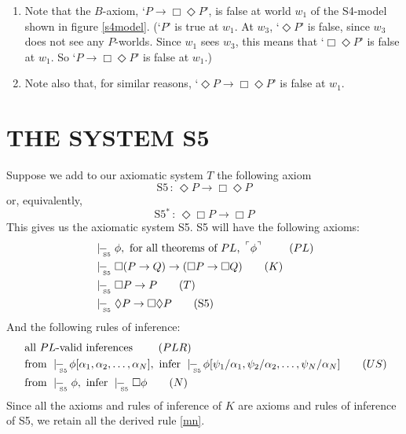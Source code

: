 \documentclass[landscape, two column, full page,reqno]{article}
\newcommand{\qe}{\begin{enumerate}[align=left,style=nextline,leftmargin=17pt,labelsep=5pt,font=\normalfont]}
\newcommand{\ze}{\end{enumerate}}
\newcommand{\p}{\item}
\newcommand{\fns}[1]{{\footnotesize #1}}
\newcommand{\qq}[1]{ ~\!^\ulcorner #1  ^\urcorner~\!}
\newcommand{\sfiveproves}{\mid\hspace{-3.9pt}-_{\!\!\!\raisebox{-3pt}{\text{\tiny S5}}}\hspace{3pt}}
\newcommand{\D}{\Diamond}
\newcommand{\B}{\Box}
\newcommand{\hs}{\hspace{2pt}}
\begin{document}
\p \qe \p Note that the $B$-axiom, `$P \to \B \D P$', is false at world $w_1$ of the S4-model shown in figure \ref{s4model}.  (`$P$' is true at $w_1$.  At $w_3$, `$\D P$' is false, since $w_3$ does not see any $P$-worlds.  Since $w_1$ sees $w_3$, this means that `$\B \D P$' is false at $w_1$.  So `$P \to \B \D P$' is false at $w_1$.)
	\p Note also that, for similar reasons,  `$\D P \to \B \D P$' is false at $w_1$.
	\ze 
	
\section{T\fns{HE} S\fns{YSTEM} S5}
\p Suppose we add to our axiomatic system $T$ the following axiom
	\[
	\mbox{S5} \hs:\hs \D P \to \B\D P
	\]
or, equivalently,	
	\[
	\mbox{S5$^*$} \hs:\hs \D \B P \to \B P
	\]
This gives us the axiomatic system {S5}.     S5 will have the following axioms:
		\begin{align}
		& \sfiveproves \phi, \text{ for all theorems of $PL$, $\qq{\phi}$ }			\tag{$PL$}\label{plt}	\\
		& \sfiveproves\B( P \to Q) \to (\B P \to \B Q)	\tag{$K$}\label{k}	\\
		& \sfiveproves \B P \to P			\tag{$T$} \label{t}			\\
		& \sfiveproves \D P \to \B \D P		\tag{S5} \label{s5}
		 \end{align}
And the following rules of inference:
		\begin{align}
		&\text{ all $PL$-valid inferences }	\tag{$PLR$}\label{plr}	\\
		&\text{ from } \sfiveproves \!\phi[\alpha_1, \alpha_2, \dots, \alpha_N] , \text{ infer } \sfiveproves \!\phi [\psi_1/\alpha_1, \psi_2/\alpha_2, \dots, \psi_N/\alpha_N]	\tag{$US$}\label{us}\\
		& \mbox{ from } \sfiveproves \phi, \mbox{ infer } \sfiveproves \B \phi \tag{$N$}\label{n}
		\end{align}
Since all the axioms and rules of inference of $K$ are axioms and rules of inference of S5, we retain all the derived rule \eqref{mn}.
		
\end{document}
